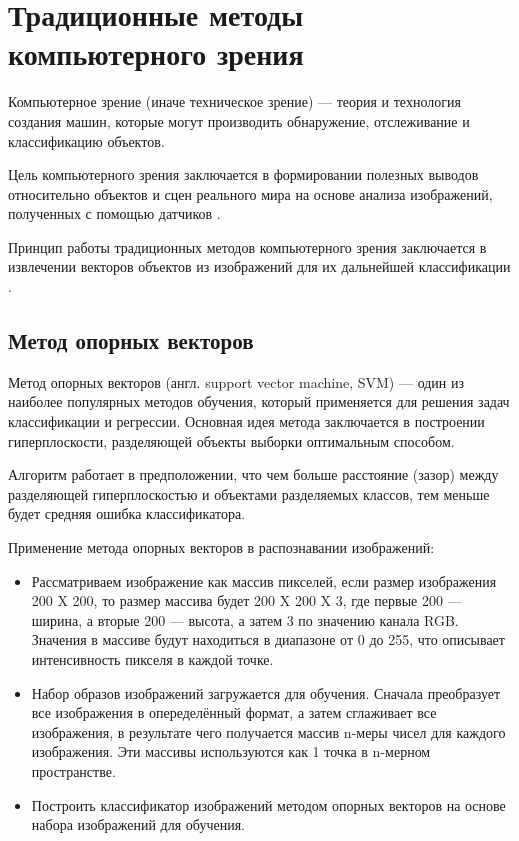 \chapter{Традиционные методы компьютерного зрения}

Компьютерное зрение (иначе техническое зрение) — теория и технология создания машин, которые могут производить обнаружение, отслеживание и классификацию объектов.

Цель компьютерного зрения заключается в формировании полезных выводов относительно объектов и сцен реального мира на основе анализа изображений, полученных с помощью датчиков \cite{computervision}.

Принцип работы традиционных методов компьютерного зрения заключается в извлечении векторов объектов из изображений для их дальнейшей классификации \cite{comparedeep}.

\section{Метод опорных векторов}

Метод опорных векторов (англ. support vector machine, SVM) — один из наиболее популярных методов обучения, который применяется для решения задач классификации и регрессии. Основная идея метода заключается в построении гиперплоскости, разделяющей объекты выборки оптимальным способом.

Алгоритм работает в предположении, что чем больше расстояние (зазор) между разделяющей гиперплоскостью и объектами разделяемых классов, тем меньше будет средняя ошибка классификатора.

Применение метода опорных векторов в распознавании изображений:
\begin{itemize}
	\item Рассматриваем изображение как массив пикселей, если размер изображения 200 X 200, то размер массива будет 200 X 200 X 3, где первые 200 — ширина, а вторые 200 — высота, а затем 3 по значению канала RGB. Значения в массиве будут находиться в диапазоне от 0 до 255, что описывает интенсивность пикселя в каждой точке.
	\item Набор образов изображений загружается для обучения. Сначала преобразует все изображения в опеределённый формат, а затем сглаживает все изображения, в результате чего получается массив n-меры чисел для каждого изображения. Эти массивы используются как 1 точка в n-мерном пространстве.
	\item Построить классификатор изображений методом опорных векторов на основе набора изображений для обучения.
\end{itemize}

